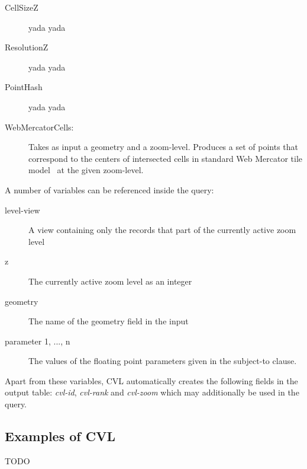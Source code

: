 \begin{description}
\item [CellSizeZ] yada yada
\item [ResolutionZ] yada yada
\item [PointHash] yada yada
\item [WebMercatorCells:] Takes as input a geometry and a zoom-level. Produces a set of points that correspond to the centers of intersected cells in standard Web Mercator tile model~\cite{osm?} at the given zoom-level.
\end{description}

A number of variables can be referenced inside the query:

\begin{description}
\item[level-view] A view containing only the records that part of the currently active zoom level
\item[z] The currently active zoom level as an integer
\item[geometry] The name of the geometry field in the input
\item[parameter 1, ..., n] The values of the floating point parameters given in the subject-to clause.
\end{description}

Apart from these variables, CVL automatically creates the following fields in the output table: \emph{cvl-id}, \emph{cvl-rank} and \emph{cvl-zoom} which may additionally be used in the query.

\subsection{Examples of CVL}

TODO
